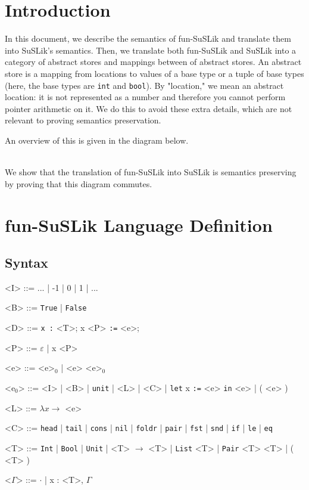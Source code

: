 \documentclass[10pt]{article}
\newcommand{\ttt}[1]{\texttt{#1}}
\newcommand{\ra}{\ensuremath{\rightarrow}}
\newcommand{\head}{\ttt{head}}
\newcommand{\tail}{\ttt{tail}}
\newcommand{\cons}{\ttt{cons}}
\newcommand{\nil}{\ttt{nil}}
\newcommand{\foldr}{\ttt{foldr}}
\newcommand{\pair}{\ttt{pair}}
\newcommand{\fst}{\ttt{fst}}
\newcommand{\snd}{\ttt{snd}}
\newcommand{\ite}{\ttt{if}}
\newcommand{\letbnd}{\ttt{let}}
\newcommand{\inexpr}{\ttt{in}}
\newcommand{\lesseq}{\ttt{le}}
\newcommand{\eq}{\ttt{eq}}
\newcommand{\sem} [1] {\llbracket#1\rrbracket}
\newcommand{\Gsem} [1] {\mathcal{G}\sem{#1}}
\newcommand{\Ssem} [1] {\mathcal{S}\sem{#1}}
\begin{document}
\section{Introduction}

In this document, we describe the semantics of fun-SuSLik and translate them
into SuSLik's semantics. Then, we translate both fun-SuSLik and SuSLik into a
category of abstract stores and mappings between of abstract stores. An abstract store is a
mapping from locations to values of a base type or a tuple of base types (here, the base types are \verb|int| and \verb|bool|).
By "location," we mean an abstract location: it is not represented as a number and therefore
you cannot perform pointer arithmetic on it. We do this to avoid these extra details, which
are not relevant to proving semantics preservation.

An overview of this is given in the diagram below.
\\


~\\
\noindent
We show that the translation of fun-SuSLik into SuSLik is semantics preserving by proving that this diagram commutes.


\section{fun-SuSLik Language Definition}
\subsection{Syntax}

\begin{grammar}
  <I> ::= ... | -1 | 0 | 1 | ...

  <B> ::= \ttt{True} | \ttt{False}

  <D> ::= \ttt{x :} <T>; x <P> \ttt{:=} <e>;

  <P> ::= $\varepsilon$ | x <P>

  <e> ::= <e>$_0$ | <e> <e>$_0$

  <e$_0$> ::= <I> | <B> | \ttt{unit} | <L> | <C> | \letbnd\; x \ttt{:=} <e> \inexpr\; <e> | ( <e> )

  <L> ::= $\lambda x \ra$ <e>

  <C> ::= \head\; | \tail\; | \cons\; | \nil\; | \foldr\; | \pair\; | \fst\; | \snd\; | \ite\; | \lesseq\; | \eq

  <T> ::= \ttt{Int} | \ttt{Bool} | \ttt{Unit} | <T> $\ra$ <T> | \ttt{List} <T> | \ttt{Pair} <T> <T> | ( <T> )

  <$\Gamma$> ::= $\cdot$ | x : <T>, $\Gamma$
\end{grammar}
\end{document}
